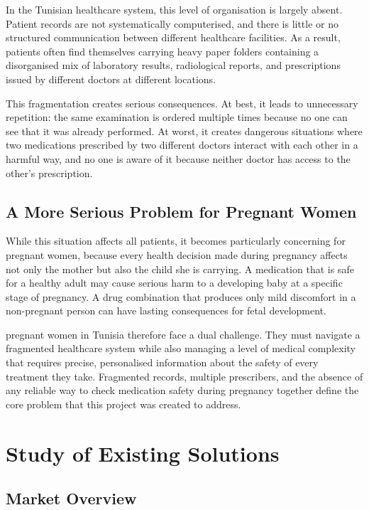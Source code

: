 In the Tunisian healthcare system, this level of organisation is largely absent. Patient
records are not systematically computerised, and there is little or no structured
communication between different healthcare facilities. As a result, patients often find
themselves carrying heavy paper folders containing a disorganised mix of laboratory results,
radiological reports, and prescriptions issued by different doctors at different locations.

This fragmentation creates serious consequences. At best, it leads to unnecessary
repetition: the same examination is ordered multiple times because no one can see that it
was already performed. At worst, it creates dangerous situations where two medications
prescribed by two different doctors interact with each other in a harmful way, and no one
is aware of it because neither doctor has access to the other's prescription.

\subsection*{A More Serious Problem for Pregnant Women}

While this situation affects all patients, it becomes particularly concerning for pregnant
women, because every health decision made during pregnancy affects not only the mother
but also the child she is carrying. A medication that is safe for a healthy adult may cause
serious harm to a developing baby at a specific stage of pregnancy. A drug combination
that produces only mild discomfort in a non-pregnant person can have lasting consequences
for fetal development.

pregnant women in Tunisia therefore face a dual challenge. They must navigate a
fragmented healthcare system while also managing a level of medical complexity that
requires precise, personalised information about the safety of every treatment they take.
Fragmented records, multiple prescribers, and the absence of any reliable way to check
medication safety during pregnancy together define the core problem that this project
was created to address.


\section{Study of Existing Solutions}

\subsection{Market Overview}


